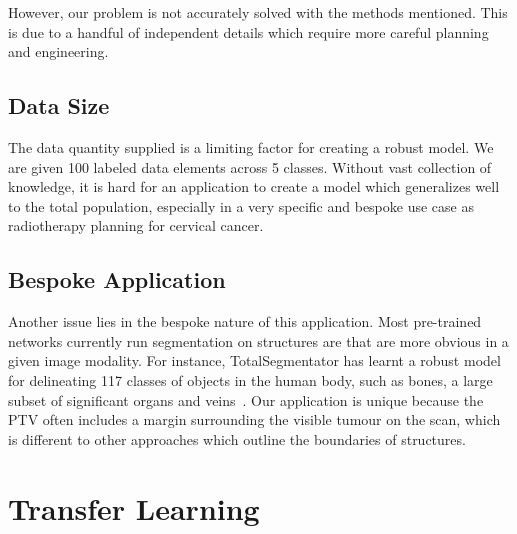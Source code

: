 \documentclass[12pt,twoside]{report}
\begin{document}

However, our problem is not accurately solved with the methods mentioned. This is due to a handful of independent details which require more careful planning and engineering.

\subsection{Data Size}\label{sect:solving-the-problem-data-size}

The data quantity supplied is a limiting factor for creating a robust model. We are given 100 labeled data elements across 5 classes. Without vast collection of knowledge, it is hard for an application to create a model which generalizes well to the total population, especially in a very specific and bespoke use case as radiotherapy planning for cervical cancer.

\subsection{Bespoke Application}\label{sect:solving-the-problem-bespoke-application}

Another issue lies in the bespoke nature of this application. Most pre-trained networks currently run segmentation on structures are that are more obvious in a given image modality. For instance, TotalSegmentator has learnt a robust model for delineating 117 classes of objects in the human body, such as bones, a large subset of significant organs and veins~\cite{totalsegmentor-git}. Our application is unique because the PTV often includes a margin surrounding the visible tumour on the scan, which is different to other approaches which outline the boundaries of structures.

\section{Transfer Learning}\label{sect:transfer-learning}
\end{document}
